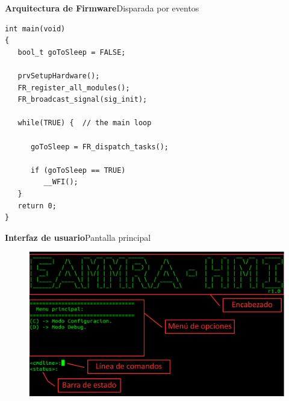 \documentclass[11pt, xcolor={table,xcdraw}]{beamer}
\begin{document}
\begin{frame}[fragile]{\textbf{\LARGE{Arquitectura de Firmware}}}{Disparada por eventos}
	  \begin{lstlisting}[basicstyle=\footnotesize]
int main(void)
{
   bool_t goToSleep = FALSE;

   prvSetupHardware();
   FR_register_all_modules();
   FR_broadcast_signal(sig_init);

   while(TRUE) {  // the main loop

      goToSleep = FR_dispatch_tasks();

      if (goToSleep == TRUE)
         __WFI();
   }
   return 0;
}
\end{lstlisting}
\end{frame}




\begin{frame}{\textbf{\LARGE{Interfaz de usuario}}}{Pantalla principal}
	\vspace{-.7cm}
	\centering
	\begin{figure}[H]
		\includegraphics[width=\textwidth]{./imagenes/interfaz_detalles.pdf}
	\end{figure}	
\end{frame}
\end{document}
